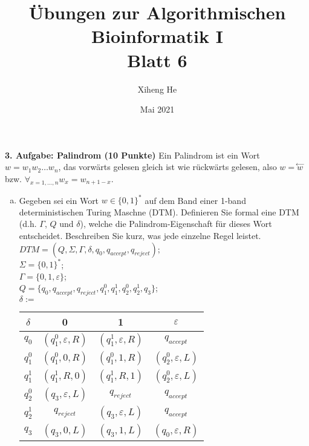 \documentclass{article}
\title{Übungen zur Algorithmischen Bioinformatik I\\
Blatt 6}
\author{Xiheng He }
\date{Mai 2021}
\begin{document}
\maketitle
\begin{flushleft}
\textbf{3. Aufgabe: Palindrom (10 Punkte)}
\newline
Ein Palindrom ist ein Wort $w = w_1w_2 \dots w_n$, das vorwärts gelesen gleich ist wie rückwärts gelesen, also $w = \stackrel{\leftarrow}{w}$ 
bzw. $\forall_{x=1,\dots,n} w_x = w_{n+1-x}$.
\begin{enumerate}[(a)]
    \item Gegeben sei ein Wort $w \in \{0,1\}^*$ auf dem Band einer 1-band deterministischen Turing Maschne (DTM). 
    \newline
    Definieren Sie formal eine DTM (d.h. $\varGamma$, $Q$ und $\delta $), welche die Palindrom-Eigenschaft für dieses
    Wort entscheidet. Beschreiben Sie kurz, was jede einzelne Regel leistet.
    \newline
    $DTM = (Q, \Sigma , \varGamma , \delta, q_0, q_{accept}, q_{reject});$ \\
    $\Sigma = \{0,1\}^*$; \\
    $\varGamma = \{0, 1, \varepsilon\}$; \\
    $Q = \{q_0, q_{accept}, q_{reject}, q_1^0, q_1^1, q_2^0, q_2^1, q_3\}$;
    \newline \\
    $\delta:=$
    \begin{tabular}{|| c | c | c | c ||}
        \hline $\delta$ & 0 & 1 & $\varepsilon$ \\
        \hline
        \hline $q_0$ & $(q_1^0, \varepsilon, R)$ & $(q_1^1, \varepsilon, R)$ & $q_{accept}$ \\
        \hline $q_1^0$ & $(q_1^0, 0, R)$ & $(q_1^0, 1, R)$ & $(q_2^0, \varepsilon, L)$ \\
        \hline $q_1^1$ & $(q_1^1, R, 0)$ & $(q_1^1, R, 1)$ & $(q_2^0, \varepsilon, L)$\\
        \hline $q_2^0$ & $(q_3, \varepsilon, L)$ & $q_{reject}$ & $q_{accept}$ \\
        \hline $q_2^1$ & $q_{reject}$ & $(q_3, \varepsilon, L)$ & $q_{accept}$ \\
        \hline $q_3$ & $(q_3, 0, L)$ & $(q_3, 1, L)$ & $(q_0, \varepsilon, R)$ \\
        \hline
    \end{tabular}
    \newline \\

\end{enumerate}
\end{flushleft}
\end{document}
